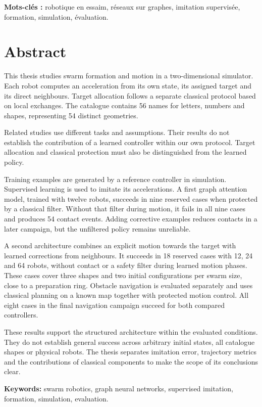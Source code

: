 \noindent\textbf{Mots-clés :} robotique en essaim, réseaux sur graphes, imitation supervisée, formation, simulation, évaluation.

\chapter*{Abstract}
This thesis studies swarm formation and motion in a two-dimensional simulator. Each robot computes an acceleration from its own state, its assigned target and its direct neighbours. Target allocation follows a separate classical protocol based on local exchanges. The catalogue contains 56 names for letters, numbers and shapes, representing 54 distinct geometries.

Related studies use different tasks and assumptions. Their results do not establish the contribution of a learned controller within our own protocol. Target allocation and classical protection must also be distinguished from the learned policy.

Training examples are generated by a reference controller in simulation. Supervised learning is used to imitate its accelerations. A first graph attention model, trained with twelve robots, succeeds in nine reserved cases when protected by a classical filter. Without that filter during motion, it fails in all nine cases and produces 54 contact events. Adding corrective examples reduces contacts in a later campaign, but the unfiltered policy remains unreliable.

A second architecture combines an explicit motion towards the target with learned corrections from neighbours. It succeeds in 18 reserved cases with 12, 24 and 64 robots, without contact or a safety filter during learned motion phases. These cases cover three shapes and two initial configurations per swarm size, close to a preparation ring. Obstacle navigation is evaluated separately and uses classical planning on a known map together with protected motion control. All eight cases in the final navigation campaign succeed for both compared controllers.

These results support the structured architecture within the evaluated conditions. They do not establish general success across arbitrary initial states, all catalogue shapes or physical robots. The thesis separates imitation error, trajectory metrics and the contributions of classical components to make the scope of its conclusions clear.

\noindent\textbf{Keywords:} swarm robotics, graph neural networks, supervised imitation, formation, simulation, evaluation.

\cleardoublepage
\tableofcontents
